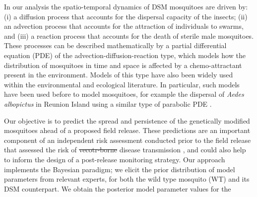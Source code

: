 \documentclass[]{bmcart}
\providecommand{\DIFaddtex}[1]{{\protect\color{blue}\uwave{#1}}} %
\providecommand{\DIFdeltex}[1]{{\protect\color{red}\sout{#1}}}                      %
\providecommand{\DIFaddbegin}{} %
\providecommand{\DIFaddend}{} %
\providecommand{\DIFdelbegin}{} %
\providecommand{\DIFdelend}{} %
\providecommand{\DIFadd}[1]{\texorpdfstring{\DIFaddtex{#1}}{#1}} %
\providecommand{\DIFdel}[1]{\texorpdfstring{\DIFdeltex{#1}}{}} %
\newcommand{\DIFscaledelfig}{0.5}
\newlength{\DIFdelgraphicswidth} %
\newlength{\DIFdelgraphicsheight} %
\newcommand{\DIFaddincludegraphics}[2][]{{\color{blue}\fbox{\DIFOincludegraphics[#1]{#2}}}} %
\newcommand{\DIFdelincludegraphics}[2][]{%
\sbox{\DIFdelgraphicsbox}{\DIFOincludegraphics[#1]{#2}}%
\settoboxwidth{\DIFdelgraphicswidth}{\DIFdelgraphicsbox} %
\settoboxtotalheight{\DIFdelgraphicsheight}{\DIFdelgraphicsbox} %
\scalebox{\DIFscaledelfig}{%
\parbox[b]{\DIFdelgraphicswidth}{\usebox{\DIFdelgraphicsbox}\\[-\baselineskip] \rule{\DIFdelgraphicswidth}{0em}}\llap{\resizebox{\DIFdelgraphicswidth}{\DIFdelgraphicsheight}{%
\setlength{\unitlength}{\DIFdelgraphicswidth}%
\begin{picture}(1,1)%
\thicklines\linethickness{2pt} %
{\color[rgb]{1,0,0}\put(0,0){\framebox(1,1){}}}%
{\color[rgb]{1,0,0}\put(0,0){\line( 1,1){1}}}%
{\color[rgb]{1,0,0}\put(0,1){\line(1,-1){1}}}%
\end{picture}%
}\hspace*{3pt}}} %
} %
\DeclareRobustCommand{\DIFaddbegin}{\DIFOaddbegin \let\includegraphics\DIFaddincludegraphics} %
\DeclareRobustCommand{\DIFaddend}{\DIFOaddend \let\includegraphics\DIFOincludegraphics} %
\DeclareRobustCommand{\DIFdelbegin}{\DIFOdelbegin \let\includegraphics\DIFdelincludegraphics} %
\DeclareRobustCommand{\DIFdelend}{\DIFOaddend \let\includegraphics\DIFOincludegraphics} %
\begin{document}

In our analysis the spatio-temporal dynamics of DSM mosquitoes are driven by: (i) a diffusion process that accounts for the dispersal capacity of the insects; (ii) an advection process that accounts for the attraction of individuals to swarms, and (iii) a reaction process that accounts for the death of sterile male mosquitoes. These processes can be described mathematically by a partial differential equation (PDE) of the advection-diffusion-reaction type, which models how the distribution of mosquitoes in time and space is affected by a chemo-attractant present in the environment. Models of this type have also been widely used within the environmental and ecological literature. In particular, such models have been used before to model mosquitoes, for example the dispersal of \emph{Aedes albopictus} in Reunion Island using a similar type of parabolic PDE \citep{Dufourd2012}.

Our objective is to predict the spread and persistence of the genetically modified mosquitoes ahead of a proposed field release. These predictions are an important component of an independent risk assessment conducted prior to the field release \cite{Hayes2015a} that assessed the risk of \DIFdelbegin \DIFdel{vecotr-borne }\DIFdelend \DIFaddbegin \DIFadd{vector-borne }\DIFaddend disease transmission \cite{Hosack2020}, and could also help to inform the design of a post-release monitoring strategy. Our approach implements the Bayesian paradigm; we elicit the prior distribution of model parameters from relevant experts, for both the wild type mosquito (WT) and its DSM counterpart. We obtain the posterior model parameter values for the 
\DIFaddbegin 
\end{document}
